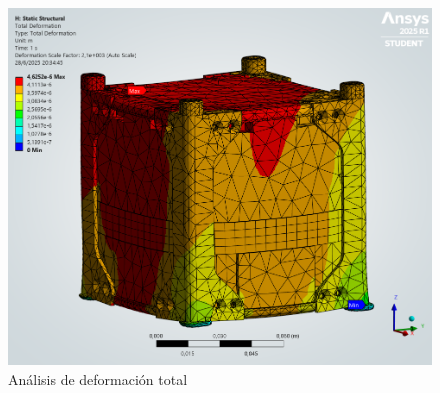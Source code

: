   \begin{figure}[H]
    \centering
    \includegraphics[width=14cm]{image/fem/ansys_cubesat-static_deformation.png}
    \caption{Análisis de deformación total}
  \end{figure}

